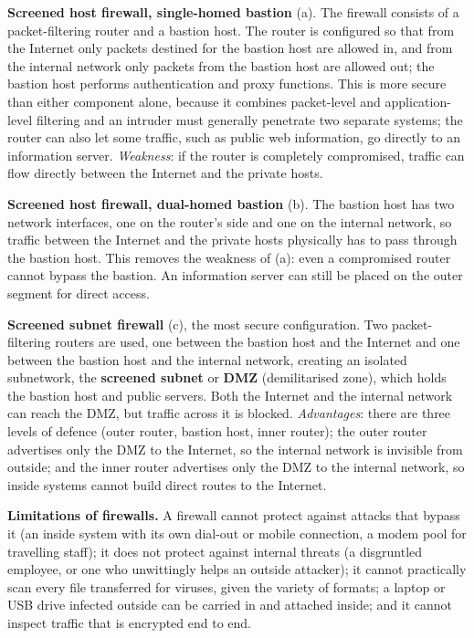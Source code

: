\textbf{Screened host firewall, single-homed bastion} (a). The firewall consists of a packet-filtering router and a bastion host. The router is configured so that from the Internet only packets destined for the bastion host are allowed in, and from the internal network only packets from the bastion host are allowed out; the bastion host performs authentication and proxy functions. This is more secure than either component alone, because it combines packet-level and application-level filtering and an intruder must generally penetrate two separate systems; the router can also let some traffic, such as public web information, go directly to an information server. \emph{Weakness}: if the router is completely compromised, traffic can flow directly between the Internet and the private hosts.

\textbf{Screened host firewall, dual-homed bastion} (b). The bastion host has two network interfaces, one on the router's side and one on the internal network, so traffic between the Internet and the private hosts physically has to pass through the bastion host. This removes the weakness of (a): even a compromised router cannot bypass the bastion. An information server can still be placed on the outer segment for direct access.

\textbf{Screened subnet firewall} (c), the most secure configuration. Two packet-filtering routers are used, one between the bastion host and the Internet and one between the bastion host and the internal network, creating an isolated subnetwork, the \textbf{screened subnet} or \textbf{DMZ} (demilitarised zone), which holds the bastion host and public servers. Both the Internet and the internal network can reach the DMZ, but traffic across it is blocked. \emph{Advantages}: there are three levels of defence (outer router, bastion host, inner router); the outer router advertises only the DMZ to the Internet, so the internal network is invisible from outside; and the inner router advertises only the DMZ to the internal network, so inside systems cannot build direct routes to the Internet.

\textbf{Limitations of firewalls.} A firewall cannot protect against attacks that bypass it (an inside system with its own dial-out or mobile connection, a modem pool for travelling staff); it does not protect against internal threats (a disgruntled employee, or one who unwittingly helps an outside attacker); it cannot practically scan every file transferred for viruses, given the variety of formats; a laptop or USB drive infected outside can be carried in and attached inside; and it cannot inspect traffic that is encrypted end to end.

